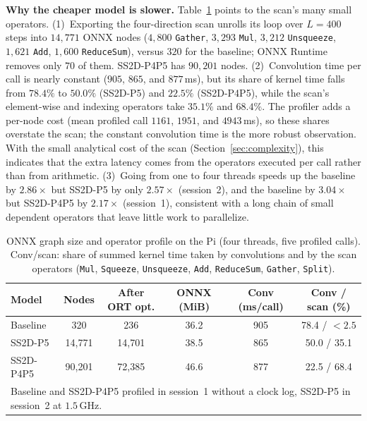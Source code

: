 \textbf{Why the cheaper model is slower.} Table~\ref{tab:graph_profile} points to the scan's many small operators. (1)~Exporting the four-direction scan unrolls its loop over $L = 400$ steps into $14{,}771$ ONNX nodes ($4{,}800$ \texttt{Gather}, $3{,}293$ \texttt{Mul}, $3{,}212$ \texttt{Unsqueeze}, $1{,}621$ \texttt{Add}, $1{,}600$ \texttt{ReduceSum}), versus $320$ for the baseline; ONNX Runtime removes only $70$ of them. SS2D-P4P5 has $90{,}201$ nodes. (2)~Convolution time per call is nearly constant ($905$, $865$, and $877$\,ms), but its share of kernel time falls from $78.4\%$ to $50.0\%$ (SS2D-P5) and $22.5\%$ (SS2D-P4P5), while the scan's element-wise and indexing operators take $35.1\%$ and $68.4\%$. The profiler adds a per-node cost (mean profiled call $1161$, $1951$, and $4943$\,ms), so these shares overstate the scan; the constant convolution time is the more robust observation. With the small analytical cost of the scan (Section~\ref{sec:complexity}), this indicates that the extra latency comes from the operators executed per call rather than from arithmetic. (3)~Going from one to four threads speeds up the baseline by $2.86\times$ but SS2D-P5 by only $2.57\times$ (session~2), and the baseline by $3.04\times$ but SS2D-P4P5 by $2.17\times$ (session~1), consistent with a long chain of small dependent operators that leave little work to parallelize.

\begin{table}[!t]
\caption{ONNX graph size and operator profile on the Pi (four threads, five profiled calls). Conv/scan: share of summed kernel time taken by convolutions and by the scan operators (\texttt{Mul}, \texttt{Squeeze}, \texttt{Unsqueeze}, \texttt{Add}, \texttt{ReduceSum}, \texttt{Gather}, \texttt{Split}).}
\label{tab:graph_profile}
\centering
\footnotesize
\setlength{\tabcolsep}{3.4pt}
\begin{tabular}{lccccc}
\toprule
\textbf{Model} & \textbf{Nodes} & \textbf{After ORT opt.} & \textbf{ONNX (MiB)} & \textbf{Conv (ms/call)} & \textbf{Conv / scan (\%)} \\
\midrule
Baseline & 320 & 236 & 36.2 & 905 & 78.4 / $<2.5$ \\
SS2D-P5 & 14{,}771 & 14{,}701 & 38.5 & 865 & 50.0 / 35.1 \\
SS2D-P4P5 & 90{,}201 & 72{,}385 & 46.6 & 877 & 22.5 / 68.4 \\
\bottomrule
\multicolumn{6}{p{0.92\textwidth}}{\scriptsize Baseline and SS2D-P4P5 profiled in session~1 without a clock log, SS2D-P5 in session~2 at $1.5$\,GHz.} \\
\end{tabular}
\end{table}

